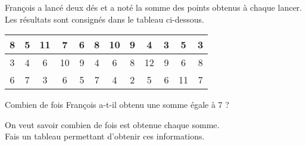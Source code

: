 François a lancé deux dés et a noté la somme des points obtenus à chaque lancer. Les résultats sont consignés dans le tableau ci-dessous.
\begin{center}
  \begin{tabular}{|*{12}{c|}}
    \hline
8&5&11&7&6&8&10&9&4&3&5&3\\
\hline
3&4&6&10&9&4&6&8&12&9&6&8\\
\hline
6&7&3&6&5&7&4&2&5&6&11&7\\
\hline
  \end{tabular}
\end{center}
\begin{myenumerate}
  \item Combien de fois François a-t-il obtenu une somme égale à 7 ?
  \item On veut savoir combien de fois est obtenue chaque somme.\\Fais un tableau permettant d'obtenir ces informations.
\end{myenumerate}